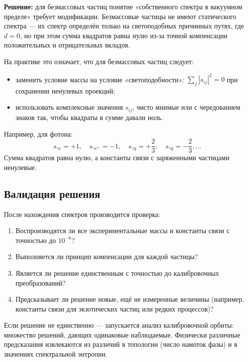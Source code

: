 \documentclass[12pt,a4paper]{article}
\begin{document}
\textbf{Решение:} для безмассовых частиц понятие «собственного спектра в вакуумном пределе» требует модификации. Безмассовые частицы не имеют статического спектра --- их спектр определён только на светоподобных причинных путях, где $d = 0$, но при этом сумма квадратов равна нулю из-за точной компенсации положительных и отрицательных вкладов.

На практике это означает, что для безмассовых частиц следует:
\begin{itemize}
    \item заменить условие массы на условие «светоподобности»: $\sum_j |s_{ij}|^2 = 0$ при сохранении ненулевых проекций;
    \item использовать комплексные значения $s_{ij}$, чисто мнимые или с чередованием знаков так, чтобы квадраты в сумме давали ноль.
\end{itemize}

Например, для фотона:
\begin{equation}
    s_{\gamma e} = +1, \quad s_{\gamma e^+} = -1, \quad s_{\gamma q} = +\frac{2}{3}, \quad s_{\gamma \bar{q}} = -\frac{2}{3}, \dots
\end{equation}
Сумма квадратов равна нулю, а константы связи с заряженными частицами ненулевые.

\subsection{Валидация решения}
После нахождения спектров производится проверка:

\begin{enumerate}[label=(\arabic*)]
    \item Воспроизводятся ли все экспериментальные массы и константы связи с точностью до $10^{-6}$?
    \item Выполняется ли принцип компенсации для каждой частицы?
    \item Является ли решение единственным с точностью до калибровочных преобразований?
    \item Предсказывает ли решение новые, ещё не измеренные величины (например, константы связи для экзотических частиц или редких процессов)?
\end{enumerate}

Если решение не единственно --- запускается анализ калибровочной орбиты: множество решений, дающих одинаковые наблюдаемые. Физически различные предсказания извлекаются из различий в топологии (число намоток фазы) и в значениях спектральной энтропии.
\end{document}
